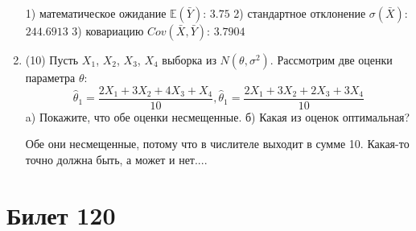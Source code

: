 \documentclass[a4paper,12pt]{article}
\begin{document}
\begin{enumerate}
1) математическое ожидание $\mathbb{E}(\bar Y)$: $3.75$ 
2) стандартное отклонение $\sigma(\bar X)$: $244.6913$
3) ковариацию $Cov(\bar X, \bar Y)$: $3.7904$


\item


(10) Пусть $X _{1}$, $X _{2}$, $X _{3}$, $X _{4}$ выборка из $N(\theta, \sigma ^{2})$. Рассмотрим две оценки параметра $\theta$:
\[\hat \theta _{1} = \frac{2X _{1} + 3X _{2} + 4X _{3} + X _{4}}{10}, \hat \theta _{1} = \frac{2X _{1} + 3X _{2} + 2X _{3} + 3X _{4}}{10}\]
a) Покажите, что обе оценки несмещенные.
б) Какая из оценок оптимальная?




Обе они несмещенные, потому что в числителе выходит в сумме 10.
Какая-то точно должна быть, а может и нет....



\end{enumerate}

\section{Билет 120}
\end{document}
